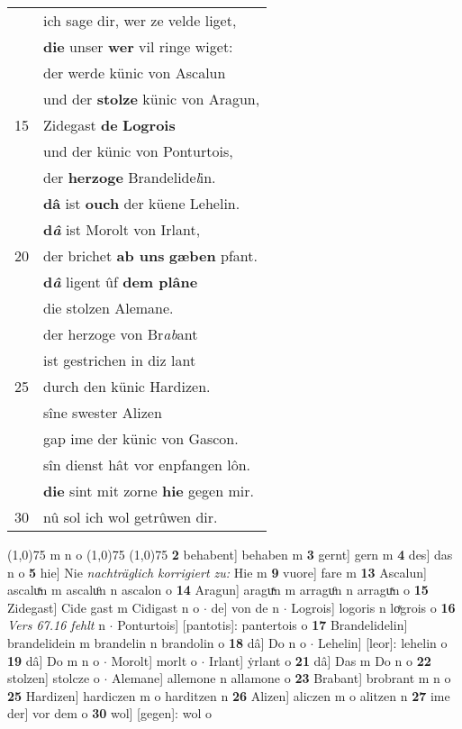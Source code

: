 \documentclass[8pt,a4paper,notitlepage]{article}
\begin{document}
\begin{table}[ht]
\begin{minipage}[t]{0.5\linewidth}
\begin{tabular}{rl}
 & ich sage dir, wer ze velde liget,\\ 
 & \textbf{die} unser \textbf{wer} vil ringe wiget:\\ 
 & der werde künic von Ascalun\\ 
 & und der \textbf{stolze} künic von Aragun,\\ 
15 & Zidegast \textbf{de} \textbf{Logrois}\\ 
 & und der künic von Ponturtois,\\ 
 & der \textbf{herzoge} Brandelide\textit{l}in.\\ 
 & \textbf{dâ} ist \textbf{ouch} der küene Lehelin.\\ 
 & \textbf{d\textit{â}} ist Morolt von Irlant,\\ 
20 & der brichet \textbf{ab uns} \textbf{gæben} pfant.\\ 
 & \textbf{d\textit{â}} ligent ûf \textbf{dem plâne}\\ 
 & die stolzen Alemane.\\ 
 & der herzoge von Br\textit{ab}ant\\ 
 & ist gestrichen in diz lant\\ 
25 & durch den künic Hardizen.\\ 
 & sîne swester Alizen\\ 
 & gap ime der künic von Gascon.\\ 
 & sîn dienst hât vor enpfangen lôn.\\ 
 & \textbf{die} sint mit zorne \textbf{hie} gegen mir.\\ 
30 & nû sol ich wol getrûwen dir.\\ 
\end{tabular}
\scriptsize
\line(1,0){75} \newline
m n o \newline
\line(1,0){75} \newline
\newline
\line(1,0){75} \newline
\textbf{2} behabent] behaben m \textbf{3} gernt] gern m \textbf{4} des] das n o \textbf{5} hie] Nie \textit{nachträglich korrigiert zu:} Hie m \textbf{9} vuore] fare m \textbf{13} Ascalun] ascaluͯn m ascaluͦn n ascalon o \textbf{14} Aragun] araguͯn m arraguͦn n arraguͯn o \textbf{15} Zidegast] Cide gast m Cidigast n o  $\cdot$ de] von de n  $\cdot$ Logrois] logoris n loͯgrois o \textbf{16} \textit{Vers 67.16 fehlt} n   $\cdot$ Ponturtois] [pantotis]: pantertois o \textbf{17} Brandelidelin] brandelidein m brandelin n brandolin o \textbf{18} dâ] Do n o  $\cdot$ Lehelin] [leor]: lehelin o \textbf{19} dâ] Do m n o  $\cdot$ Morolt] morlt o  $\cdot$ Irlant] ẏrlant o \textbf{21} dâ] Das m Do n o \textbf{22} stolzen] stolcze o  $\cdot$ Alemane] allemone n allamone o \textbf{23} Brabant] brobrant m n o \textbf{25} Hardizen] hardiczen m o harditzen n \textbf{26} Alizen] aliczen m o alitzen n \textbf{27} ime der] vor dem o \textbf{30} wol] [gegen]: wol o \newline
\end{minipage}
\end{table}
\end{document}
